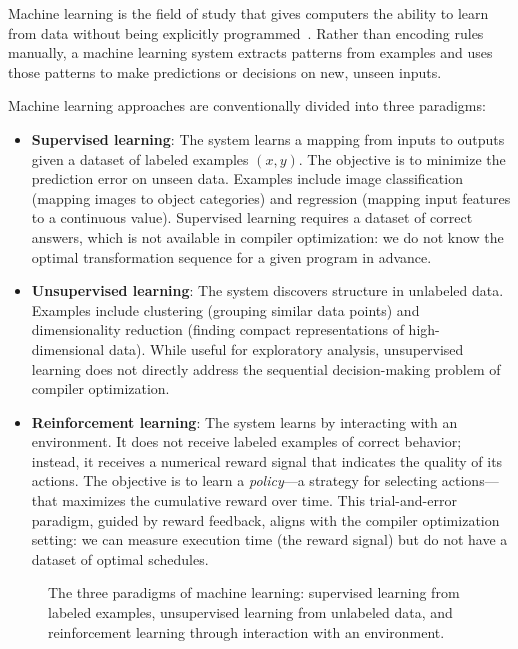 Machine learning is the field of study that gives computers the ability to learn from data without being explicitly programmed~\cite{mitchell1997machine}. Rather than encoding rules manually, a machine learning system extracts patterns from examples and uses those patterns to make predictions or decisions on new, unseen inputs.

Machine learning approaches are conventionally divided into three paradigms:

\begin{itemize}
    \item \textbf{Supervised learning}: The system learns a mapping from inputs to outputs given a dataset of labeled examples $(x, y)$. The objective is to minimize the prediction error on unseen data. Examples include image classification (mapping images to object categories) and regression (mapping input features to a continuous value). Supervised learning requires a dataset of correct answers, which is not available in compiler optimization: we do not know the optimal transformation sequence for a given program in advance.

    \item \textbf{Unsupervised learning}: The system discovers structure in unlabeled data. Examples include clustering (grouping similar data points) and dimensionality reduction (finding compact representations of high-dimensional data). While useful for exploratory analysis, unsupervised learning does not directly address the sequential decision-making problem of compiler optimization.

    \item \textbf{Reinforcement learning}: The system learns by interacting with an environment. It does not receive labeled examples of correct behavior; instead, it receives a numerical reward signal that indicates the quality of its actions. The objective is to learn a \textit{policy}—a strategy for selecting actions—that maximizes the cumulative reward over time. This trial-and-error paradigm, guided by reward feedback, aligns with the compiler optimization setting: we can measure execution time (the reward signal) but do not have a dataset of optimal schedules.
\end{itemize}

\begin{figure}[H]
    \centering
    \caption{The three paradigms of machine learning: supervised learning from labeled examples, unsupervised learning from unlabeled data, and reinforcement learning through interaction with an environment.}
    \label{fig:ml-paradigms}
\end{figure}

